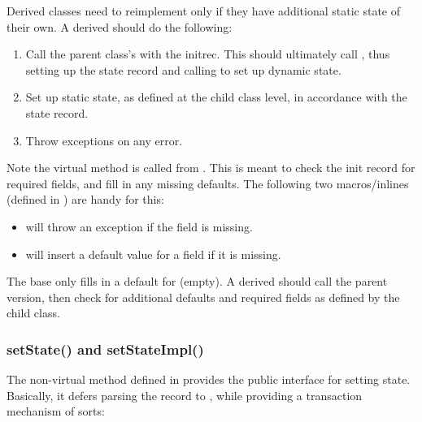 \documentclass[10pt]{article}
\begin{document}
  Derived classes need to reimplement  only if they have additional
  static state of their own. A derived  should do the following:

  \begin{enumerate}
  
  \item Call the parent class's  with the initrec. This should
    ultimately call , thus setting up the state record  and
    calling  to set up dynamic state.

  \item Set up static state, as defined at the child class level, in accordance
    with the state record.

  \item Throw exceptions on any error. 

  \end{enumerate}
  
  Note the virtual  method is called from
  . This is meant to check the init record for required
  fields, and fill in any missing defaults. The following two macros/inlines
  (defined in ) are handy for this:

  \begin{itemize}
  
  \item {} will throw an exception if the
    field is missing.

  \item {} will insert a default value
    for a field if it is missing.

  \end{itemize}
  
  The base  only fills in a default for 
  (empty). A derived  should call the parent version, then
  check for additional defaults and required fields as defined by the child
  class.

\subsubsection{setState() and setStateImpl()}

  The non-virtual  method defined in  provides the
  public interface for setting state. Basically, it defers parsing the record
  to , while providing a transaction mechanism of sorts:
\end{document}
